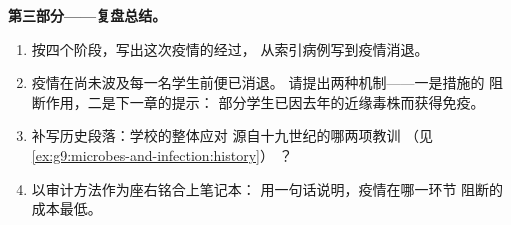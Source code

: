 \begin{problem}
\medskip\noindent\textbf{第三部分——复盘总结。}
\begin{enumerate}[resume]
  \item 按四个阶段，写出这次疫情的经过，
        从索引病例写到疫情消退。
  \item 疫情在尚未波及每一名学生前便已消退。
        请提出两种机制——一是措施的
        阻断作用，二是下一章的提示：
        部分学生已因去年的近缘毒株而获得免疫。
  \item 补写历史段落：学校的整体应对
        源自十九世纪的哪两项教训
        （见\cref{ex:g9:microbes-and-infection:history}）
        ？
  \item 以审计方法作为座右铭合上笔记本：
        用一句话说明，疫情在哪一环节
        阻断的成本最低。
\end{enumerate}
\end{problem}
